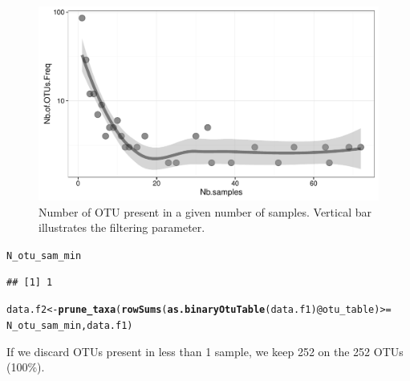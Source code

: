 \documentclass[12pt]{article}\usepackage[]{graphicx}\usepackage[]{color}
\makeatletter
\def\maxwidth{ %
  \ifdim\Gin@nat@width>\linewidth
    \linewidth
  \else
    \Gin@nat@width
  \fi
}
\newcommand{\hlopt}[1]{\textcolor[rgb]{0,0,0}{#1}}%
\newcommand{\hlstd}[1]{\textcolor[rgb]{0.345,0.345,0.345}{#1}}%
\newcommand{\hlkwb}[1]{\textcolor[rgb]{0.69,0.353,0.396}{#1}}%
\newcommand{\hlkwc}[1]{\textcolor[rgb]{0.333,0.667,0.333}{#1}}%
\newcommand{\hlkwd}[1]{\textcolor[rgb]{0.737,0.353,0.396}{\textbf{#1}}}%
\newenvironment{kframe}{%
 \def\at@end@of@kframe{}%
 \ifinner\ifhmode%
  \def\at@end@of@kframe{\end{minipage}}%
  \begin{minipage}{\columnwidth}%
 \fi\fi%
 \def\FrameCommand##1{\hskip\@totalleftmargin \hskip-\fboxsep
 \colorbox{shadecolor}{##1}\hskip-\fboxsep
     \hskip-\linewidth \hskip-\@totalleftmargin \hskip\columnwidth}%
 \MakeFramed {\advance\hsize-\width
   \@totalleftmargin\z@ \linewidth\hsize
   \@setminipage}}%
 {\par\unskip\endMakeFramed%
 \at@end@of@kframe}
\newenvironment{knitrout}{}{} %
\numberwithin{figure}{section}
\makeatother
\begin{document}
\begin{knitrout}
\begin{figure}
{\centering \includegraphics[width=\maxwidth]{figure/nbOtu_sample-1} 

}

\caption[Number of OTU present in a given number of samples]{Number of OTU present in a given number of samples. Vertical bar illustrates the filtering parameter.}\label{fig:nbOtu_sample}
\end{figure}


\end{knitrout}

\begin{knitrout}\small
{}\color{fgcolor}\begin{kframe}
\begin{alltt}
\hlstd{N_otu_sam_min}
\end{alltt}
\begin{verbatim}
## [1] 1
\end{verbatim}
\end{kframe}
\end{knitrout}

\begin{knitrout}\small
{}\color{fgcolor}\begin{kframe}
\begin{alltt}
\hlstd{data.f2} \hlkwb{<-} \hlkwd{prune_taxa}\hlstd{(}\hlkwd{rowSums}\hlstd{(}\hlkwd{as.binaryOtuTable}\hlstd{(data.f1)}\hlopt{@}\hlkwc{otu_table}\hlstd{)} \hlopt{>=}
                        \hlstd{N_otu_sam_min, data.f1)}
\end{alltt}
\end{kframe}
\end{knitrout}

If we discard OTUs present in less than 1 sample, we keep 252 on the 252 OTUs (100\%).
\end{document}
